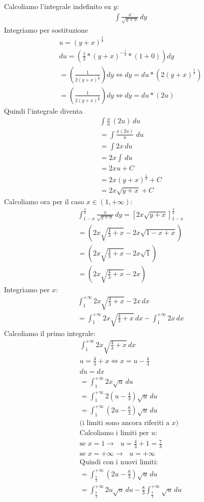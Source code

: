 \documentclass{article}
\begin{document}
Calcoliamo l'integrale indefinito su $y$:
\begin{align*}
    \int \frac{x}{\sqrt{y+x}} \,dy
\end{align*}
Integriamo per sostituzione
\begin{align*}
    u=(y+x)^{\frac{1}{2}} \\
    du=(\frac{1}{2}*(y+x)^{-\frac{1}{2}}*(1+0))dy \\
    = (\frac{1}{2(y+x)^{\frac{1}{2}}})dy \iff dy= du*(2(y+x)^{\frac{1}{2}}) \\
    = (\frac{1}{2(y+x)^{\frac{1}{2}}})dy \iff dy= du*(2u)
\end{align*}
Quindi l'integrale diventa
\begin{align*}
    \int \frac{x}{u} \,(2u) \,du \\
    = \int \frac{x(2u)}{u} \, \,du \\
    = \int 2x \, du \\
    = 2x \int \,du \\
    = 2x u +C \\
    = 2x (y+x)^{\frac{1}{2}} +C\\
    = 2x \sqrt{y+x}+C
\end{align*}
Calcoliamo ora per il caso $x\in(1,+\infty)$:
\begin{align*}
    \int_{1-x}^{\frac{4}{3}} \frac{x}{\sqrt{y+x}} \,dy = [2x \sqrt{y+x}]_{1-x}^{\frac{4}{3}} \\
    = (2x \sqrt{\frac{4}{3}+x} - 2x \sqrt{1-x+x}) \\
    = (2x \sqrt{\frac{4}{3}+x} - 2x \sqrt{1}) \\
    = (2x \sqrt{\frac{4}{3}+x} - 2x) 
\end{align*}
Integriamo per $x$:
\begin{align*}
    \int_1^{+\infty} 2x \sqrt{\frac{4}{3}+x} - 2x \, dx \\
    = \int_1^{+\infty} 2x \sqrt{\frac{4}{3}+x}\, dx - \int_1^{+\infty} 2x \, dx
\end{align*}
Calcoliamo il primo integrale:
\begin{align*}
    \int_1^{+\infty} 2x \sqrt{\frac{4}{3}+x}\, dx \\
    u=\frac{4}{3}+x \iff x=u-\frac{4}{3}\\
    du=dx \\
    = \int_1^{+\infty} 2x \sqrt{u} \,du  \\
    = \int_1^{+\infty} 2(u-\frac{4}{3}) \sqrt{u} \,du \\
    = \int_1^{+\infty} (2u-\frac{8}{3}) \sqrt{u} \,du
    \\\text{(i limiti sono ancora riferiti a $x$)}\\
    \text{Calcoliamo i limiti per $u$: } \\
    \text{se $x=1\to$ } u=\frac{4}{3}+1=\frac{7}{3} \\
    \text{se $x=+\infty \to$ } u=+\infty \\
    \text{Quindi con i nuovi limiti: } \\
    = \int_{\frac{7}{3}}^{+\infty} (2u-\frac{8}{3})  \sqrt{u} \,du \\
    = \int_{\frac{7}{3}}^{+\infty} 2u\sqrt{u}\,du - \frac{8}{3}\int_{\frac{7}{3}}^{+\infty}\sqrt{u}\,du
\end{align*}
\end{document}
